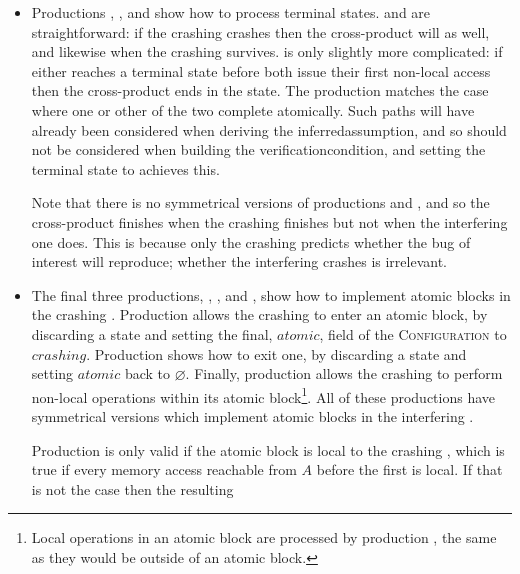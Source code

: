 \begin{itemize}
\item Productions , , and  show how
  to process terminal states.   and  are
  straightforward: if the crashing {\StateMachine} crashes then the
  cross-product {\StateMachine} will as well, and likewise when the
  crashing {\StateMachine} survives.   is only slightly
  more complicated: if either {\StateMachine} reaches a terminal state
  before both {\StateMachines} issue their first non-local access then
  the cross-product {\StateMachine} ends in the 
  state.  The production matches the case where one or other of the
  two {\StateMachines} complete atomically.  Such paths will have
  already been considered when deriving the \gls{inferredassumption},
  and so should not be considered when building the
  \gls{verificationcondition}, and setting the terminal state to
   achieves this.

  Note that there is no symmetrical versions of productions
   and , and so the cross-product
          {\StateMachine} finishes when the crashing {\StateMachine}
          finishes but not when the interfering one does.  This is
          because only the crashing {\StateMachine} predicts whether
          the bug of interest will reproduce; whether the interfering
          {\StateMachine} crashes is irrelevant.

\item The final three productions, , , and
  , show how to implement atomic blocks in the crashing
          {\StateMachine}.  Production  allows the crashing
          {\StateMachine} to enter an atomic block, by discarding a
           state and setting the final,
          $\mathit{atomic}$, field of the \textsc{Configuration} to
          $\mathit{crashing}$.  Production  shows how to
          exit one, by discarding a  state and
          setting $\mathit{atomic}$ back to $\varnothing$.  Finally,
          production  allows the crashing {\StateMachine}
          to perform non-local operations within its atomic
          block\footnote{Local operations in an atomic block are
            processed by production , the same as they
            would be outside of an atomic block.}.  All of these
          productions have symmetrical versions which implement atomic
          blocks in the interfering {\StateMachine}.

          Production  is only valid if the atomic block is
          local to the crashing {\StateMachine}, which is true if
          every memory access reachable from $A$ before the first
           is local.  If that is not the case then
          the resulting 
\end{itemize}

